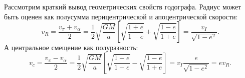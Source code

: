 Рассмотрим краткий вывод геометрических свойств годографа. Радиус может быть оценен как полусумма перицентрической и апоцентрической скорости:
\begin{equation*}
	v_{R} = \frac{v_{\pi}+v_{\alpha}}{2}=\frac{1}{2}\sqrt{\frac{GM}{a}}\left[\sqrt{\frac{1+e}{1-e}}+\sqrt{\frac{1-e}{1+e}}\right]=\frac{v_I}{\sqrt{1-e^2}}.
\end{equation*}
А центральное смещение как полуразность:
\begin{equation*}
	v_{c} = \frac{v_{\pi}-v_{\alpha}}{2}=\frac{1}{2}\sqrt{\frac{GM}{a}}\left[\sqrt{\frac{1+e}{1-e}}-\sqrt{\frac{1-e}{1+e}}\right]=v_{I}\frac{e}{\sqrt{1-e^2}}=e v_{R}.
\end{equation*}

